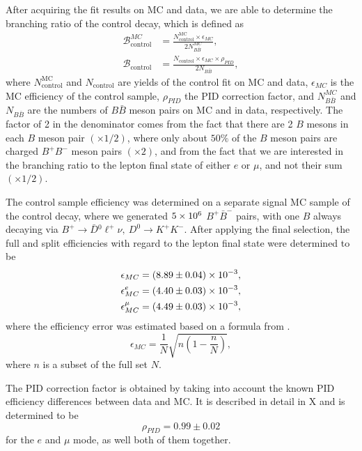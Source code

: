 After acquiring the fit results on MC and data, we are able to determine the branching ratio of the control decay, which is defined as
\begin{align}
\mathcal{B}^{MC}_{\mathrm{control}} &= \frac{N^{\mathrm{MC}}_\mathrm{control} \times \epsilon_{MC}}{2N_{B\bar B}^{MC}},\\
\mathcal{B}_{\mathrm{control}} &= \frac{N_\mathrm{control} \times \epsilon_{MC} \times \rho_{PID}}{2N_{B\bar B}},
\label{eq:br_data}
\end{align}
where $N^{\mathrm{MC}}_\mathrm{control}$ and $N_\mathrm{control}$ are yields of the control fit on MC and data, $\epsilon_{MC}$ is the MC efficiency of the control sample, $\rho_{PID}$ the PID correction factor, and $N_{B\bar B}^{MC}$ and $N_{B\bar B}$ are the numbers of $B \bar B$ meson pairs on MC and in data, respectively. The factor of 2 in the denominator comes from the fact that there are 2 $B$ mesons in each $B$ meson pair $(\times 1/2)$, where only about $50\%$ of the $B$ meson pairs are charged $B^+B^-$ meson pairs $(\times 2)$, and from the fact that we are interested in the branching ratio to the lepton final state of either $e$ or $\mu$, and not their sum $(\times 1/2)$.

The control sample efficiency was determined on a separate signal MC sample of the control decay, where we generated $5\times 10^{6}$ $B^+ \bar B^-$ pairs, with one $B$ always decaying via $B^+ \to \bar D {}^0 \ell^+ \nu,~D^0 \to K^+K^-$. After applying the final selection, the full and split efficiencies with regard to the lepton final state were determined to be 
\begin{align*}
\epsilon_{MC} &= (8.89\pm 0.04)\times 10^{-3},\\
\epsilon_{MC}^e &= (4.40\pm 0.03)\times 10^{-3},\\
\epsilon_{MC}^\mu &= (4.49\pm 0.03)\times 10^{-3},
\end{align*}
where the efficiency error was estimated based on a formula from \cite{paterno2004calculating}.
\begin{equation*}
\epsilon_{MC} = \frac{1}{N}\sqrt{n(1-\frac{n}{N})},
\end{equation*}
where $n$ is a subset of the full set $N$.

The PID correction factor is obtained by taking into account the known PID efficiency differences between data and MC. It is described in detail in X and is determined to be
\begin{equation*}
\rho_{PID} = 0.99\pm 0.02
\end{equation*}
for the $e$ and $\mu$ mode, as well both of them together.

